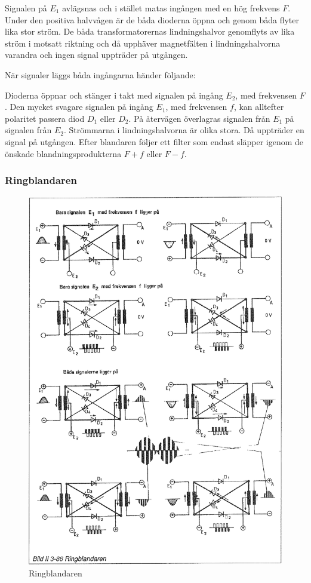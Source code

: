 Signalen på \(E_1\) avlägsnas och i stället matas ingången med en hög
frekvens \(F\). Under den positiva halvvågen är de båda dioderna öppna
och genom båda flyter lika stor ström. De båda transformatorernas
lindningshalvor genomflyts av lika ström i motsatt riktning och då
upphäver magnetfälten i lindningshalvorna varandra och ingen signal
uppträder på utgången.

När signaler läggs båda ingångarna händer följande:

Dioderna öppnar och stänger i takt med signalen på ingång \(E_2\), med
frekvensen \(F\). Den mycket svagare signalen på ingång \(E_1\), med
frekvensen \(f\), kan alltefter polaritet passera diod \(D_1\) eller
\(D_2\). På återvägen överlagras signalen från \(E_1\) på signalen
från \(E_2\). Strömmarna i lindningshalvorna är olika stora. Då
uppträder en signal på utgången.  Efter blandaren följer ett filter
som endast släpper igenom de önskade blandningsprodukterna \(F + f\)
eller \(F - f\).

\subsubsection{Ringblandaren}

\begin{figure}
\includegraphics[width=\textwidth]{images/bild_2_3-86}
\caption{Ringblandaren}
\label{fig:BildII3-86}
\end{figure}

